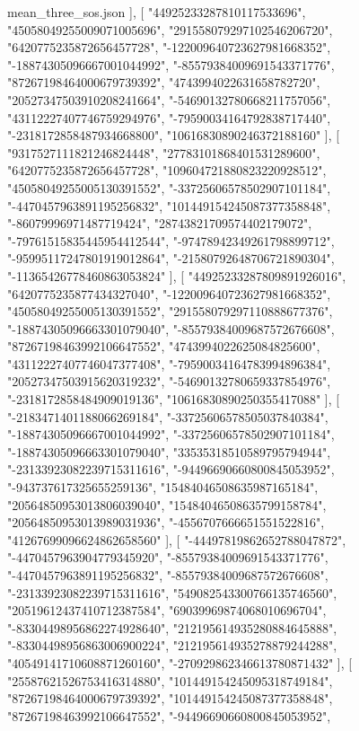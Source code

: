 \begin{filecontents*}[overwrite]{mean_three_sos.json}
   ],
   [
    "44925233287810117533696",
    "45058049255009071005696",
    "291558079297102546206720",
    "6420775235872656457728",
    "-122009640723627981668352",
    "-18874305096667001044992",
    "-85579384009691543371776",
    "87267198464000679739392",
    "4743994022631658782720",
    "20527347503910208241664",
    "-54690132780668211757056",
    "43112227407746759294976",
    "-79590034164792838717440",
    "-2318172858487934668800",
    "10616830890246372188160"
   ],
   [
    "9317527111821246824448",
    "27783101868401531289600",
    "6420775235872656457728",
    "109604721880823220928512",
    "45058049255005130391552",
    "-33725606578502907101184",
    "-4470457963891195256832",
    "101449154245087377358848",
    "-86079996971487719424",
    "28743821709574402179072",
    "-79761515835445954412544",
    "-97478942349261798899712",
    "-95995117247801919012864",
    "-21580792648706721890304",
    "-11365426778460863053824"
   ],
   [
    "44925233287809891926016",
    "6420775235877434327040",
    "-122009640723627981668352",
    "45058049255005130391552",
    "291558079297110888677376",
    "-18874305096663301079040",
    "-85579384009687572676608",
    "87267198463992106647552",
    "4743994022625084825600",
    "43112227407746047377408",
    "-79590034164783994896384",
    "20527347503915620319232",
    "-54690132780659337854976",
    "-2318172858484909019136",
    "10616830890250355417088"
   ],
   [
    "-2183471401188066269184",
    "-33725606578505037840384",
    "-18874305096667001044992",
    "-33725606578502907101184",
    "-18874305096663301079040",
    "33535318510589795794944",
    "-23133923082239715311616",
    "-94496690660800845053952",
    "-943737617325655259136",
    "15484046508635987165184",
    "20564850953013806039040",
    "15484046508635799158784",
    "20564850953013989031936",
    "-4556707666651551522816",
    "41267699096624862658560"
   ],
   [
    "-44497819862652788047872",
    "-4470457963904779345920",
    "-85579384009691543371776",
    "-4470457963891195256832",
    "-85579384009687572676608",
    "-23133923082239715311616",
    "549082543300766135746560",
    "20519612437410712387584",
    "69039969874068010696704",
    "-83304498956862274928640",
    "212195614935280884645888",
    "-83304498956863006900224",
    "212195614935278879244288",
    "40549141710608871260160",
    "-270929862346613780871432"
   ],
   [
    "25587621526753416314880",
    "101449154245095318749184",
    "87267198464000679739392",
    "101449154245087377358848",
    "87267198463992106647552",
    "-94496690660800845053952",

\end{filecontents*}

